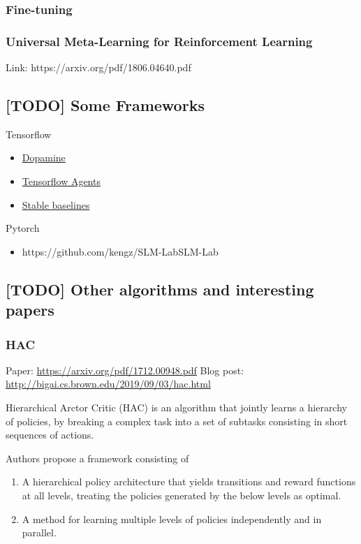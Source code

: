 \documentclass[12pt, english]{article}
\begin{document}
\subsubsection{Fine-tuning}


\subsubsection{Universal Meta-Learning for Reinforcement Learning}

Link: https://arxiv.org/pdf/1806.04640.pdf


\subsection{[TODO] Some Frameworks}

Tensorflow

\begin{itemize}
  \item \href{}{Dopamine}
  \item \href{}{Tensorflow Agents}
  \item \href{https://stable-baselines.readthedocs.io/en/master/}{Stable baselines}
\end{itemize}

Pytorch

\begin{itemize}
  \item {https://github.com/kengz/SLM-Lab}{SLM-Lab}
\end{itemize}


\subsection{[TODO] Other algorithms and interesting papers}

\subsubsection{HAC}

Paper: \url{https://arxiv.org/pdf/1712.00948.pdf}
Blog post: \url{http://bigai.cs.brown.edu/2019/09/03/hac.html}

Hierarchical Arctor Critic (HAC) \cite{levy_learning_2019} is an algorithm that jointly learns a hierarchy of policies, by breaking a complex task into a set of subtasks consisting in short sequences of actions.

Authors propose a framework consisting of

\begin{enumerate}
  \item A hierarchical policy architecture that yields transitions and reward functions at all levels, treating the policies generated by the below levels as optimal.
  \item A method for learning multiple levels of policies independently and in parallel.
\end{enumerate}
\end{document}
